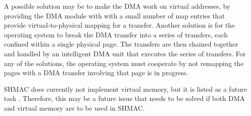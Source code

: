 A possible solution may be to make the DMA work on virtual addresses, by providing the DMA module with with a small number of map entries that provide virtual-to-physical mapping for a transfer.
Another solution is for the operating system to break the DMA transfer into a series of transfers, each confined within a single physical page.
The transfers are then chained together and handled by an intelligent DMA unit that executes the series of transfers. 
For any of the solutions, the operating system must cooperate by not remapping the pages with a DMA transfer involving that page is in progress.

SHMAC does currently not implement virtual memory, but it is listed as a future task \cite{shmac-plan}.
Therefore, this may be a future issue that needs to be solved if both DMA and virtual memory are to be used in SHMAC. 
